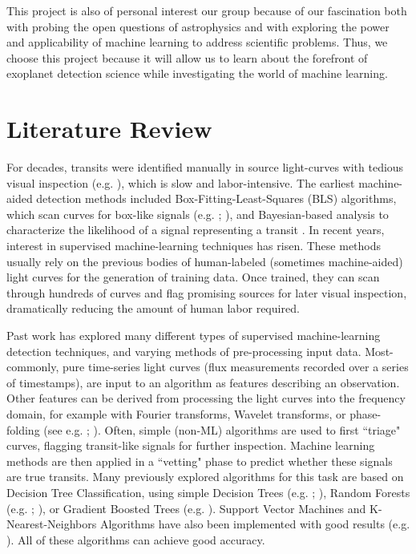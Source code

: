 \documentclass{article}
\begin{document}
This project is also of personal interest our group because of our fascination both with probing the open questions of astrophysics and with exploring the power and applicability of machine learning to address scientific problems. Thus, we choose this project because it will allow us to learn about the forefront of exoplanet detection science while investigating the world of machine learning.

\section{Literature Review}


For decades, transits were identified manually in source light-curves with tedious visual inspection (e.g. \citealp{Charbonneau2000}), which is slow and labor-intensive. The earliest machine-aided detection methods included Box-Fitting-Least-Squares (BLS) algorithms, which scan curves for box-like signals (e.g. \citealp{Kovac2002}; \citealp{Grziwa2012}), and Bayesian-based analysis to characterize the likelihood of a signal representing a transit \citep{Aigrain2002}. In recent years, interest in supervised machine-learning techniques has risen. These methods usually rely on the previous bodies of human-labeled (sometimes machine-aided) light curves for the generation of training data. Once trained, they can scan through hundreds of curves and flag promising sources for later visual inspection, dramatically reducing the amount of human labor required. 


Past work has explored many different types of supervised machine-learning detection techniques, and varying methods of pre-processing input data. Most-commonly, pure time-series light curves (flux measurements recorded over a series of timestamps), are input to an algorithm as features describing an observation. Other features can be derived from processing the light curves into the frequency domain, for example with Fourier transforms, Wavelet transforms, or phase-folding (see e.g. \citealp{Stumpe2014}; \citealp{Pearson2018}). Often, simple (non-ML) algorithms are used to first ``triage" curves, flagging transit-like signals for further inspection. Machine learning methods are then applied in a ``vetting" phase to predict whether these signals are true transits. Many previously explored algorithms for this task are based on Decision Tree Classification, using simple Decision Trees (e.g. \citealp{Coughlin_2016}; \citealp{Catanzarite_2015}), Random Forests (e.g. \citealp{Armstrong_2015}; \citealp{McCauliff_2015}), or Gradient Boosted Trees (e.g. \citealp{Malik_2021}). Support Vector Machines and K-Nearest-Neighbors Algorithms have also been implemented with good results (e.g. \citealp{Schanche_2018}). All of these algorithms can achieve good accuracy. 
\end{document}
